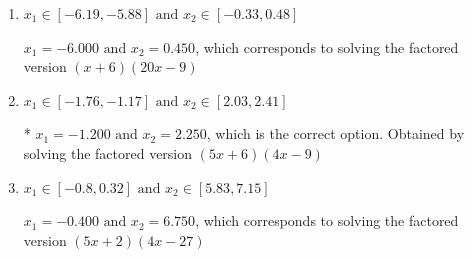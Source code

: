 \documentclass{extbook}[14pt]
\begin{document}
\begin{enumerate}
{\begin{enumerate}[label=\Alph*.]
$x_1 = -24.000 \text{ and } x_2 = 45.000$, which corresponds to solving the factored version $(x + 24)(x -45)$
\item \( x_1 \in [-6.19, -5.88] \text{ and } x_2 \in [-0.33, 0.48] \)

$x_1 = -6.000 \text{ and } x_2 = 0.450$, which corresponds to solving the factored version $(x + 6)(20x -9)$
\item \( x_1 \in [-1.76, -1.17] \text{ and } x_2 \in [2.03, 2.41] \)

* $x_1 = -1.200 \text{ and } x_2 = 2.250$, which is the correct option. Obtained by solving the factored version $(5x + 6)(4x -9)$
\item \( x_1 \in [-0.8, 0.32] \text{ and } x_2 \in [5.83, 7.15] \)

$x_1 = -0.400 \text{ and } x_2 = 6.750$, which corresponds to solving the factored version $(5x + 2)(4x -27)$
\end{enumerate}

}
\end{enumerate}
\end{document}
